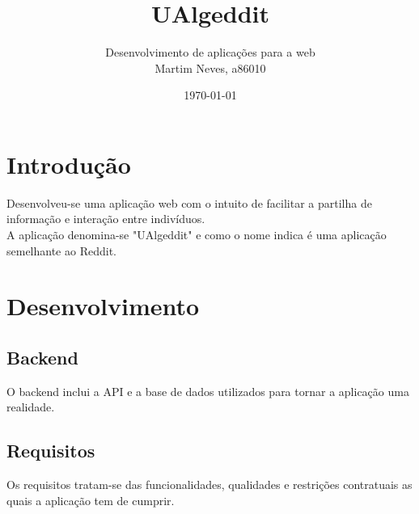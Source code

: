 \documentclass{article}
\title{UAlgeddit}
\author{Desenvolvimento de aplicações para a web \\ Martim Neves, a86010}
\date{\today}
\begin{document}
	\maketitle
	
	\tableofcontents
	
	\newpage
	
	\section{Introdução}
	Desenvolveu-se uma aplicação web com o intuito de facilitar a partilha de informação e interação entre indivíduos.\\
	A aplicação denomina-se "UAlgeddit" e como o nome indica é uma aplicação semelhante ao Reddit.
	
	\section{Desenvolvimento}
	
	\subsection{Backend}
	O backend inclui a API e a base de dados utilizados para tornar a aplicação uma realidade.
	\subsection{Requisitos}
	Os requisitos tratam-se das funcionalidades, qualidades e restrições contratuais as quais a aplicação tem de cumprir.
\end{document}
